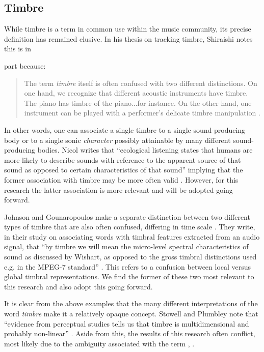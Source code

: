 \documentclass[12pt]{report} 	%
\numberwithin{figure}{chapter}
\numberwithin{table}{chapter}
\numberwithin{equation}{chapter}
\begin{document}
\begin{flushleft}
\section{Timbre}
While timbre is a term in common use within the music community, its precise definition has remained elusive. In his thesis on tracking timbre, Shiraishi notes this is in \begin{singlespace}\noindent part because:
\selectfont
\begin{quote}
The term \textit{timbre} itself is often confused with two different distinctions. On one hand, we recognize that different acoustic instruments have timbre. The piano has timbre of the piano...for instance. On the other hand, one instrument can be played with a performer's delicate timbre manipulation \cite[p. 4]{Shiraishi:2006ye}.
\end{quote}
\end{singlespace}
\selectfont
In other words, one can associate a single timbre to a single sound-producing body or to a single sonic \textit{character} possibly attainable by many different sound-producing bodies. Nicol writes that ``ecological listening states that humans are more likely to describe sounds with reference to the apparent source of that sound as opposed to certain characteristics of that sound'' implying that the former association with timbre may be more often valid \cite[p. 23]{Nicol:2005rp}. However, for this research the latter association is more relevant and will be adopted going forward. 

Johnson and Gounaropoulos make a separate distinction between two different types of timbre that are also often confused, differing in time scale \cite{Johnson:2006pi}. They write, in their study on associating words with timbral features extracted from an audio signal, that ``by timbre we will mean the micro-level spectral characteristics of sound as discussed by Wishart, as opposed to the gross timbral distinctions used e.g. in the MPEG-7 standard'' \cite[p. 1]{Johnson:2006pi}. This refers to a confusion between local versus global timbral representations. We find the former of these two most relevant to this research and also adopt this going forward.

It is clear from the above examples that the many different interpretations of the word \textit{timbre} make it a relatively opaque concept. Stowell and Plumbley note that ``evidence from perceptual studies tells us that timbre is multidimensional and probably non-linear'' \cite[p. 1]{Stowell:2008qf}. Aside from this, the results of this research often conflict, most likely due to the ambiguity associated with the term \cite[p. 4]{Fiebrink:os}, \cite[p. 11]{Ciglar:2009uf}.


\end{flushleft}
\end{document}

